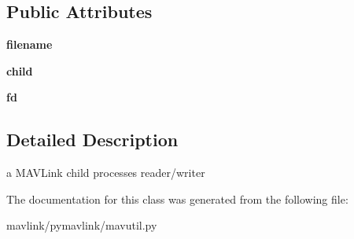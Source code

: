 \subsection*{Public Attributes}
\begin{DoxyCompactItemize}
\item 
\mbox{\label{classpymavlink_1_1mavutil_1_1mavchildexec_ae0133d930cc07cfd3044acd79467ad39}} 
{\bfseries filename}
\item 
\mbox{\label{classpymavlink_1_1mavutil_1_1mavchildexec_a9ef348cfba7512397dc40271ad168cdf}} 
{\bfseries child}
\item 
\mbox{\label{classpymavlink_1_1mavutil_1_1mavchildexec_a039de5bba86d9d52c421e2763258e720}} 
{\bfseries fd}
\end{DoxyCompactItemize}


\subsection{Detailed Description}
\begin{DoxyVerb}a MAVLink child processes reader/writer\end{DoxyVerb}
 

The documentation for this class was generated from the following file\+:\begin{DoxyCompactItemize}
\item 
mavlink/pymavlink/mavutil.\+py\end{DoxyCompactItemize}
